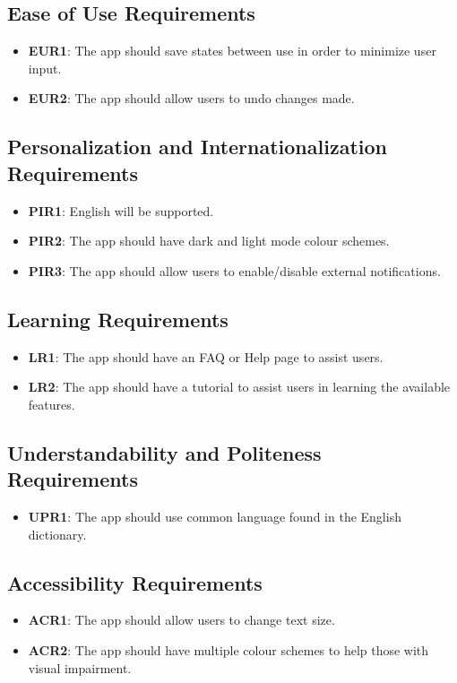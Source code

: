\documentclass[12pt]{article}
\begin{document}
\subsection{Ease of Use Requirements}
\begin{itemize}
  \item \textbf{EUR1}: The app should save states between use in order to minimize user input.
  \item \textbf{EUR2}: The app should allow users to undo changes made.
\end{itemize}
\subsection{Personalization and Internationalization Requirements}
\begin{itemize}
  \item \textbf{PIR1}: English will be supported.
  \item \textbf{PIR2}: The app should have dark and light mode colour schemes.
  \item \textbf{PIR3}: The app should allow users to enable/disable external notifications.
\end{itemize}
\subsection{Learning Requirements}
\begin{itemize}
  \item \textbf{LR1}: The app should have an FAQ or Help page to assist users.
  \item \textbf{LR2}: The app should have a tutorial to assist users in learning the available
  features.
\end{itemize}
\subsection{Understandability and Politeness Requirements}
\begin{itemize}
  \item \textbf{UPR1}: The app should use common language found in the English dictionary.
\end{itemize}
\subsection{Accessibility Requirements}
\begin{itemize}
  \item \textbf{ACR1}: The app should allow users to change text size.
  \item \textbf{ACR2}: The app should have multiple colour schemes to help those with visual impairment.
\end{itemize}
\end{document}
